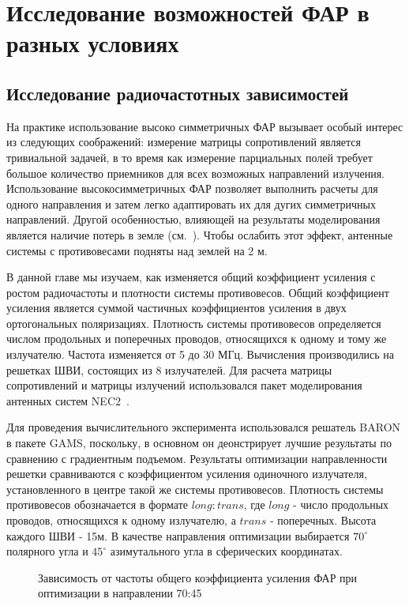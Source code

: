 \chapter{Исследование возможностей ФАР в разных условиях}\label{sec:radio}

\section{Исследование радиочастотных зависимостей}
 На практике использование высоко симметричных ФАР вызывает особый интерес из следующих соображений: измерение матрицы сопротивлений является тривиальной задачей, в то время как измерение парциальных полей требует большое количество приемников для всех возможных направлений излучения. Использование высокосимметричных ФАР позволяет выполнить расчеты для одного направления и затем легко адаптировать их для дугих симметричных направлений. Другой особенностью, влияющей на результаты моделирования является наличие потерь в земле (см.~\cite{yurkov:groundloss}). Чтобы ослабить этот эффект, антенные системы с противовесами подняты над землей на 2 м.

В данной главе мы изучаем, как изменяется общий коэффициент усиления с ростом радиочастоты и плотности системы противовесов. Общий коэффициент усиления является суммой частичных коэффициентов усиления в  двух ортогональных поляризациях. Плотность системы противовесов определяется числом продольных и поперечных проводов, относящихся к одному и тому же излучателю. Частота изменяется от 5 до 30 МГц. Вычисления производились на решетках ШВИ, состоящих из 8 излучателей. Для расчета матрицы сопротивлений и матрицы излучений использовался пакет моделирования антенных систем NEC2~\cite{bruke:nec2}.

Для проведения вычислительного эксперимента использовался решатель BARON в пакете GAMS, поскольку, в основном он деонстрирует лучшие результаты по сравнению с градиентным подъемом. Результаты оптимизации направленности решетки сравниваются с коэффициентом усиления одиночного излучателя, установленного в центре такой же системы противовесов. Плотность системы противовесов обозначается в формате $long:trans$, где $long$ - число продольных проводов, относящихся к одному излучателю, а $trans$ - поперечных. Высота каждого ШВИ - 15м. В качестве направления оптимизации выбирается $70^{\circ}$ полярного угла и $45^{\circ}$ азимутального угла в сферических координатах.

\begin{figure}
\caption{Зависимость от частоты общего коэффициента усиления ФАР при оптимизации в направлении 70:45}
\label{ris:paa_gains}
\end{figure}

